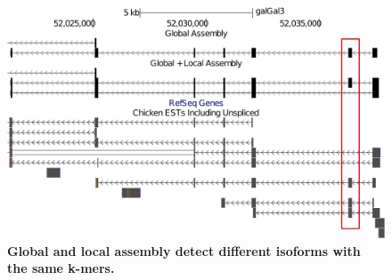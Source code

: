 \documentclass[10pt]{article}
\begin{document}
\begin{figure}[!ht]
\begin{center}
\includegraphics[width=5in]{global_vs_local.pdf}
\end{center}
\caption{
{\bf Global and local assembly detect different isoforms with the same k-mers.} 
}
\label{global_vs_local}
\end{figure}




\end{document}
